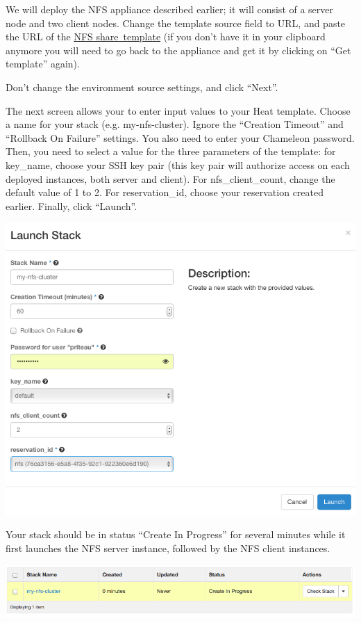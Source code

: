 We will deploy the NFS appliance described earlier; it will consist of a
server node and two client nodes. Change the template source field to
URL, and paste the URL of the
\href{https://www.chameleoncloud.org/appliances/api/appliances/25/template}{NFS
share~template} (if you don't have it in your clipboard anymore you will
need to go back to the appliance and get it by clicking on ``Get
template'' again).

Don't change the environment source settings, and click ``Next''.

The next screen allows your to enter input values to your Heat template.
Choose a name for your stack (e.g. my-nfs-cluster). Ignore the
``Creation Timeout'' and ``Rollback On Failure'' settings. You also need
to enter your Chameleon password. Then, you need to select a value for
the three parameters of the template: for key\_name, choose your SSH key
pair (this key pair will authorize access on each deployed instances,
both server and client). For nfs\_client\_count, change the default
value of 1 to 2. For reservation\_id, choose your reservation created
earlier. Finally, click ``Launch''.

\includegraphics[width=\columnwidth]{images/chameleon/Launch-NFS-Stack.png}

Your stack should be in status ``Create In Progress'' for several
minutes while it first launches the NFS server instance, followed by the
NFS client instances.

\includegraphics[width=\columnwidth]{images/chameleon/Create-In-Progress_zPgOjo4.png}

